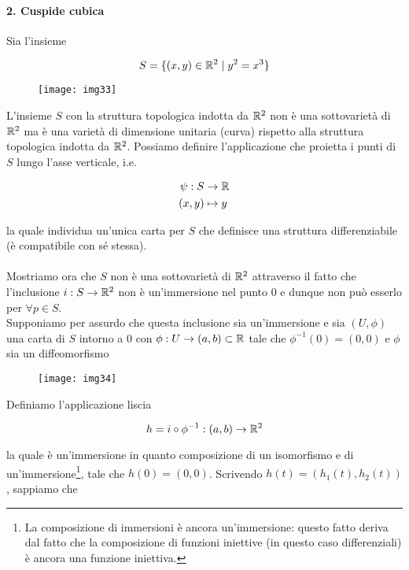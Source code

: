 \paragraph{2. Cuspide cubica}

Sia l'insieme

\begin{equation}
	S = \{ (x,y) \in \mathbb{R}^{2} \mid y^{2}=x^{3} \}
\end{equation}

\begin{figure}[H]
	\centering
	\texttt{[image: img33]}
\end{figure}

L'insieme $ S $ con la struttura topologica indotta da $ \mathbb{R}^{2} $ non è una sottovarietà di $ \mathbb{R}^{2} $ ma è una varietà di dimensione unitaria (curva) rispetto alla struttura topologica indotta da $ \mathbb{R}^{2} $. Possiamo definire l'applicazione che proietta i punti di $ S $ lungo l'asse verticale, i.e.

\begin{align}
	\begin{split}
		\psi : S &\to \mathbb{R}\\
		(x,y) &\mapsto y
	\end{split}
\end{align}

la quale individua un'unica carta per $ S $ che definisce una struttura differenziabile (è compatibile con sé stessa).\\\\
%
Mostriamo ora che $ S $ non è una sottovarietà di $ \mathbb{R}^{2} $ attraverso il fatto che l'inclusione $ i : S \to \mathbb{R}^{2} $ non è un'immersione nel punto 0 e dunque non può esserlo per $ \forall p \in S $.\\
Supponiamo per assurdo che questa inclusione sia un'immersione e sia $ (U,\phi) $ una carta di $ S $ intorno a 0 con $ \phi : U \to (a,b) \subset \mathbb{R} $ tale che $ \phi^{-1}(0)=(0,0) $ e $ \phi $ sia un diffeomorfismo

\begin{figure}[H]
	\centering
	\texttt{[image: img34]}
\end{figure}

Definiamo l'applicazione liscia

\begin{equation}
	h = i \circ \phi^{-1} : (a,b) \to \mathbb{R}^{2}
\end{equation}

la quale è un'immersione in quanto composizione di un isomorfismo e di un'immersione\footnote{%
	La composizione di immersioni è ancora un'immersione: questo fatto deriva dal fatto che la composizione di funzioni iniettive (in questo caso differenziali) è ancora una funzione iniettiva.%
}, tale che $ h(0)=(0,0) $. Scrivendo $ h(t) = (h_{1}(t),h_{2}(t)) $, sappiamo che

